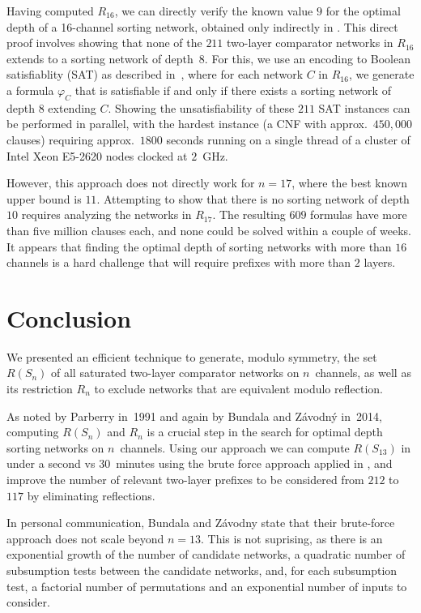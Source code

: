 \documentclass[10pt]{IEEEtran}
\begin{document}
Having computed $R_{16}$, we can directly verify the known value $9$ for the optimal depth of a 16-channel sorting network, obtained only indirectly in \cite{DBLP:conf/lata/BundalaZ14}.
This direct proof involves
showing that none of the $211$
two-layer comparator networks in $R_{16}$ extends to a sorting network
of depth~$8$. For this, we use an encoding to Boolean
satisfiablity (SAT) as described in~\cite{DBLP:conf/lata/BundalaZ14},
where for each network $C$
in $R_{16}$, we generate a
formula $\varphi_C$
that
is satisfiable if and only if there exists a
sorting network of depth $8$
extending $C$.
Showing the unsatisfiability of these $211$ SAT instances can be performed in
parallel, with the hardest instance (a CNF with approx.\ $450{,}000$ clauses) requiring approx.\ $1800$ seconds running on a single thread of a cluster of Intel Xeon E5-2620 nodes clocked at $2$~GHz.



However, this approach does not directly work for $n=17$, where the best known
upper bound is $11$.
Attempting to show that there is no sorting network of depth $10$
requires analyzing the networks in
$R_{17}$. The resulting $609$ formulas have more than five
million clauses each, and none could be solved within a couple of weeks.
It appears that finding the optimal
depth of sorting networks with more than $16$ channels is a hard
challenge that will require prefixes with more than $2$ layers.

\section{Conclusion}

We presented an efficient technique to generate, modulo symmetry, the
set $R(S_n)$ of all saturated two-layer comparator networks on $n$~channels,
as well as its restriction $R_n$ to exclude networks
that are equivalent modulo reflection.

As noted by Parberry in~1991 and again by Bundala and Z{\'a}vodn{\'y} in~2014,
computing $R(S_n)$ and $R_n$ is a crucial step in the search for
optimal depth sorting networks on $n$~channels.
Using our approach we can compute $R(S_{13})$ in under a second vs
$30$~minutes using the brute force approach applied in \cite{DBLP:conf/lata/BundalaZ14},
and
improve the number of relevant two-layer prefixes to be considered
from $212$ to $117$ by eliminating
reflections.

In personal communication, Bundala and Z{\'a}vodny state that their
brute-force approach does not scale beyond $n=13$. This is not
suprising, as there is an exponential growth of the number of
candidate networks, a quadratic number of subsumption tests between
the candidate networks, and, for each subsumption test, a factorial number
of permutations and an exponential number of inputs to consider.
\end{document}
